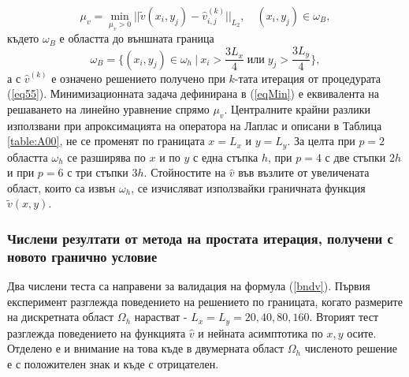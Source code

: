 \documentclass[a4paper]{article}
\newcommand{\be}{\begin{equation}}
\newcommand{\ee}{\end{equation}}
\newcommand{\rf}[1]{(\ref{#1})}
\theoremstyle{remark}
\begin{document}
\begin{equation}\label{eqMin}
\mu_v = \min_{ \mu_v > 0 } || \tilde v( x_i, y_j) - \widehat v^{(k)}_{i,j} ||_{L_2}, \quad (x_i, y_j) \in \omega_B ,
\end{equation}
където $\omega_B$ е областта до външната граница
\be\label{omegaB}
\omega_B = \{ (x_i, y_j) \in \omega_h \: | \: x_i > \frac{3L_x}{4} \; \textbf{или} \; y_j > \frac{3L_y}{4} \},
\ee
а с $\widehat v^{(k)}$ е означено решението получено при $k$-тата итерация от процедурата \rf{eq55}. Минимизационната задача дефинирана в \rf{eqMin} е еквивалента на решаването на линейно уравнение спрямо $\mu_v$. Централните крайни разлики използвани при апроксимацията на оператора на Лаплас и описани в Таблица \ref{table:A00}, не се променят по границата $x=L_x$ и $y=L_y$. За целта при $p=2$ областта $\omega_h$ се разширява по $x$ и по $y$ с една стъпка $h$, при $p=4$ с две стъпки $2h$ и при $p=6$ с три стъпки $3h$.
Стойностите на $\widehat v$ във възлите от увеличената област, които са извън $\omega_h$, се изчисляват използвайки граничната функция $\tilde v(x, y)$.

\subsubsection{Числени резултати от метода на простата итерация, получени с новото гранично условие}
Два числени теста са направени за валидация на формула \rf{bndv}. Първия експеримент разглежда поведението на решението по границата, когато размерите на дискретната област $\Omega_h$ нарастват - $L_x = L_y = 20, 40, 80, 160$. Вторият тест разглежда поведението на функцията $\widehat v$ и нейната асимптотика по $x,y$ осите. Отделено е и внимание на това къде в двумерната област $\Omega_h$ численото решение е с положителен знак и къде с отрицателен.
\end{document}
